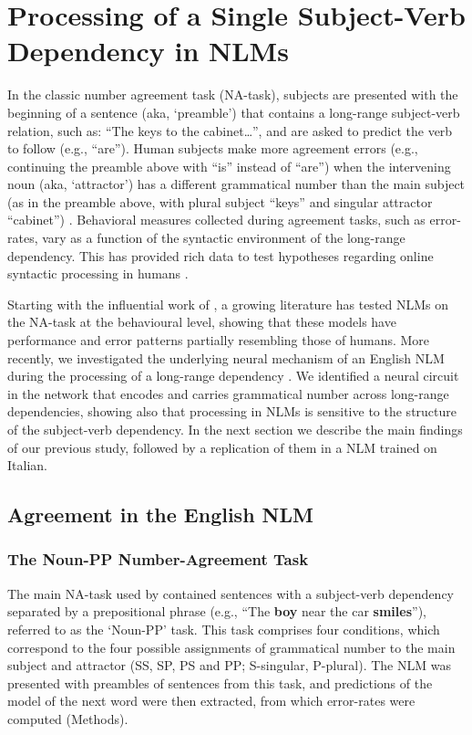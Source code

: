 \section{Processing of a Single Subject-Verb Dependency in NLMs}
In the classic number agreement task (NA-task), subjects are presented with the beginning of a sentence (aka, `preamble') that contains a long-range subject-verb relation, such as: ``The keys to the cabinet\ldots'', and are asked to predict the verb to follow (e.g., ``are''). Human subjects make more agreement errors (e.g., continuing the preamble  above with ``is'' instead of ``are'') when the intervening noun (aka, `attractor') has a different grammatical number than the main subject (as in the preamble above, with plural subject ``keys'' and singular attractor ``cabinet'') . Behavioral measures collected during agreement tasks, such as error-rates, vary as a function of the syntactic environment of the long-range dependency. This has provided rich data to test hypotheses regarding online syntactic processing in humans \citep[e.g., ][]{franck2002subject, franck2006agreement, franck2007syntactic}.

Starting with the influential work of \citet{Linzen:etal:2016}, a growing
literature \citep[e.g.,][]{Gulordava:etal:2018, Bernardy:Lappin:2017,
  Giulianelli:etal:2018, Kuncoro:etal:2018a,Linzen:Leonard:2018,jumelet2019analysing} has
tested NLMs on the NA-task at the behavioural level, showing that these models have performance
and error patterns partially resembling those of humans.
More recently, we investigated the underlying neural mechanism of an
English NLM during the processing of a long-range dependency
\citep{lakretz2019emergence}. We identified a neural circuit in the
network that encodes and carries grammatical number across long-range
dependencies, showing also that processing in NLMs is sensitive to the
structure of the subject-verb dependency. In the next section we
describe the main findings of our previous study, followed by a replication of them in a NLM trained on Italian. 



\subsection{Agreement in the English NLM}

\subsubsection{The Noun-PP Number-Agreement Task}
The main NA-task used by \citet{lakretz2019emergence} contained sentences with a subject-verb dependency separated by a prepositional phrase (e.g., ``The \textbf{boy} near the car \textbf{smiles}''), referred to as the `Noun-PP' task. This task comprises four conditions, which correspond to the four possible assignments of grammatical number to the main subject and attractor (SS, SP, PS and PP; S-singular, P-plural). The NLM was presented with preambles of sentences from this task, and predictions of the model of the next word were then extracted, from which error-rates were computed (Methods). 


